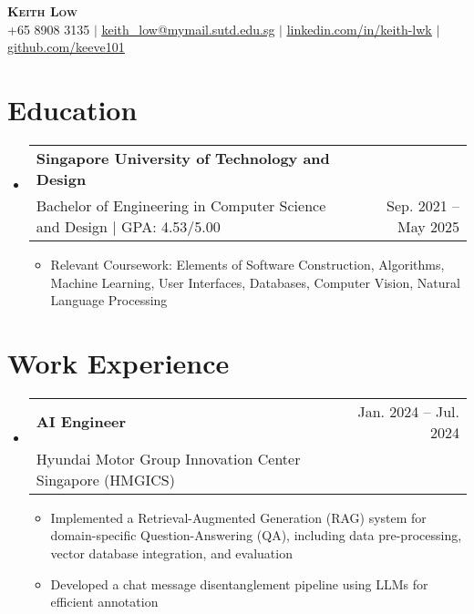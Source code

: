 \documentclass[letterpaper,11pt]{article}
\makeatletter
\newcommand{\resumeItem}[1]{
  \item\small{
    {#1 \vspace{-2pt}}
  }
}
\newcommand{\resumeSubheading}[4]{
  \vspace{-2pt}\item
    \begin{tabular*}{0.97\textwidth}[t]{l@{\extracolsep{\fill}}r}
      \textbf{#1} & #2 \\
      \textnormal{\small#3} & \textnormal{\small #4} \\
    \end{tabular*}\vspace{-7pt}
}
\newcommand{\resumeSubHeadingListStart}{\begin{itemize}[leftmargin=0.15in, label={}]}
\newcommand{\resumeSubHeadingListEnd}{\end{itemize}}
\newcommand{\resumeItemListStart}{\begin{itemize}}
\newcommand{\resumeItemListEnd}{\end{itemize}\vspace{-5pt}}
\makeatother
\begin{document}

\begin{center}
    \textbf{\Huge \scshape Keith Low} \\ \vspace{1pt}
    \small +65 8908 3135 $|$ \href{mailto:keith_low@mymail.sutd.edu.sg}{\underline{keith\_low@mymail.sutd.edu.sg}} $|$ 
    \href{https://linkedin.com/in/keith-lwk}{\underline{linkedin.com/in/keith-lwk}} $|$
    \href{https://github.com/keeve101}{\underline{github.com/keeve101}}
\end{center}

\section{Education}
  \resumeSubHeadingListStart
    \resumeSubheading
      {Singapore University of Technology and Design}{}
      {Bachelor of Engineering in Computer Science and Design $|$ GPA: 4.53/5.00}{Sep. 2021 -- May 2025}
      \resumeItemListStart
        \resumeItem{Relevant Coursework: Elements of Software Construction, Algorithms, Machine Learning, User Interfaces, Databases, Computer Vision, Natural Language Processing}
      \resumeItemListEnd
  \resumeSubHeadingListEnd
%

\section{Work Experience}
  \resumeSubHeadingListStart
    \resumeSubheading
      {AI Engineer}{Jan. 2024  -- Jul. 2024}
      {Hyundai Motor Group Innovation Center Singapore (HMGICS)}{}
      \resumeItemListStart
        \resumeItem{Implemented a Retrieval-Augmented Generation (RAG) system for domain-specific Question-Answering (QA), including data pre-processing, vector database integration, and evaluation}
        \resumeItem{Developed a chat message disentanglement pipeline using LLMs for efficient annotation}
      \resumeItemListEnd
  \resumeSubHeadingListEnd
\end{document}
